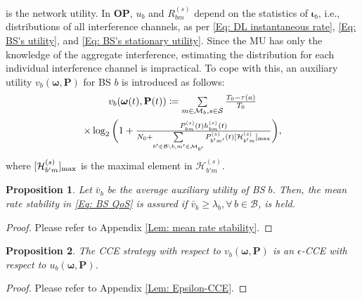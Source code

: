 \documentclass[conference]{IEEEtran}
\newtheorem{proposition}{Proposition}
\begin{document}
%
%
is the network utility. In {\bf OP}, $u_b$ and $R_{bm}^{(s)}$ depend on the statistics of $\boldsymbol{\iota}_b$, i.e., distributions of all interference channels, as per \eqref{Eq: DL instantaneous rate}, \eqref{Eq: BS's utility}, and \eqref{Eq: BS's stationary utility}. Since the MU has only the knowledge of the aggregate interference, estimating the distribution for each individual interference channel is  impractical.
To cope with this, an auxiliary utility $v_b(\boldsymbol{\omega},\mathbf{P}) $ for BS $b$ is introduced as follows:
%
\begin{multline}
\textstyle v_{b}(\boldsymbol{\omega}(t),\mathbf{P}(t))\coloneqq \sum\limits_{m\in\mathcal{M}_b,s\in\mathcal{S}}\frac{T_0-\tau(a)}{T_0} \\
%
\textstyle \times\log_2\bigg(1+\frac{P_{bm}^{(s)}(t)h_{bm}^{(s)}(t)}{N_0+\sum\limits_{b'\in\mathcal{B}\backslash b,m'\in\mathcal{M}_{b'}}P_{b'm'}^{(s)} (t)[\mathcal{H}_{b'm}^{(s)}]_{\rm max}} \bigg),\label{Eq: Remodeled utility}
\end{multline}
%
%
%
where $[\mathcal{H}_{b'm}^{(s)}]_ {\rm max}$ is the maximal element in $\mathcal{H}_{b'm}^{(s)}$.
%
%
%
\begin{proposition}\label{Prop: mean rate stability}
Let $\bar{v}_{b}$ be the average auxiliary utility of BS $b$. Then, the mean rate stability in  \eqref{Eq: BS QoS} is assured if
$\bar{v}_b\geq \lambda_{b},\forall\,b\in\mathcal{B}$,
 is held.
%
%
%
%
\end{proposition}
%
%
%
\begin{proof}
%
Please refer to Appendix \ref{Lem: mean rate stability}.
\end{proof}
%
%
%
%
%
\begin{proposition}\label{Prop: Epsilon-CCE}
The CCE strategy with respect to $v_{b}(\boldsymbol{\omega},\mathbf{P})$ is an $\epsilon$-CCE with respect to $u_{b}(\boldsymbol{\omega},\mathbf{P})$.
\end{proposition}
%
%
%
\begin{proof}
Please refer to Appendix \ref{Lem: Epsilon-CCE}.
\end{proof}
\end{document}
